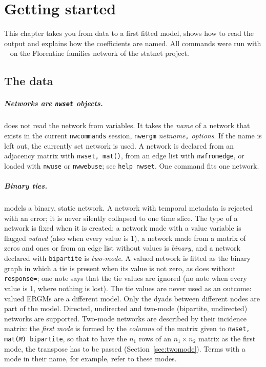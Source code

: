 \chapter{Getting started}\label{ch:start}

This chapter takes you from data to a first fitted model, shows how to read the output and explains how the coefficients are named. All commands were run with \nwergm{}~\pkgversion{} on the Florentine families network of the statnet project.

\section{The data}\label{sec:data}

\paragraph{Networks are \texttt{nwset} objects.} \nwergm{} does not read the network from variables. It takes the \emph{name} of a network that exists in the current \texttt{nwcommands} session, \texttt{nwergm} \emph{netname}\texttt{,} \emph{options}. If the name is left out, the currently set network is used. A network is declared from an adjacency matrix with \texttt{nwset, mat()}, from an edge list with \texttt{nwfromedge}, or loaded with \texttt{nwuse} or \texttt{nwwebuse}; see \texttt{help nwset}. One command fits one network.

\paragraph{Binary ties.} \nwergm{} models a binary, static network. A network with temporal metadata is rejected with an error; it is never silently collapsed to one time slice. The type of a network is fixed when it is created: a network made with a value variable is flagged \emph{valued} (also when every value is 1), a network made from a matrix of zeros and ones or from an edge list without values is \emph{binary}, and a network declared with \texttt{bipartite} is \emph{two-mode}. A valued network is fitted as the binary graph in which a tie is present when its value is not zero, as \ergm{} does without \texttt{response=}; one note says that the tie values are ignored (no note when every value is 1, where nothing is lost). The tie values are never used as an outcome: valued ERGMs are a different model. Only the dyads between different nodes are part of the model. Directed, undirected and two-mode (bipartite, undirected) networks are supported. Two-mode networks are described by their incidence matrix: the \emph{first mode} is formed by the \emph{columns} of the matrix given to \texttt{nwset, mat(\emph{M}) bipartite}, so that to have the $n_1$ rows of an $n_1\times n_2$ matrix as the first mode, the transpose has to be passed (Section~\ref{sec:twomode}). Terms with a mode in their name,  for example, refer to these modes.

